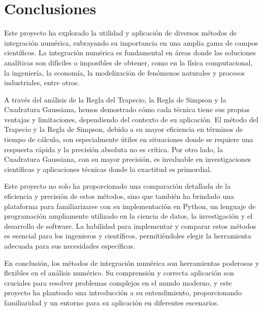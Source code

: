 \documentclass[a4paper]{article}
\begin{document}
    \section{Conclusiones}
    \label{sec:Conclusiones}
    Este proyecto ha explorado la utilidad y aplicación de diversos métodos de integración numérica, subrayando su importancia en una amplia gama de campos científicos. La integración numérica es fundamental en áreas donde las soluciones analíticas son difíciles o imposibles de obtener, como en la física computacional, la ingeniería, la economía, la modelización de fenómenos naturales y procesos industriales, entre otros.

    A través del análisis de la Regla del Trapecio, la Regla de Simpson y la Cuadratura Gaussiana, hemos demostrado cómo cada técnica tiene sus propias ventajas y limitaciones, dependiendo del contexto de su aplicación. El método del Trapecio y la Regla de Simpson, debido a su mayor eficiencia en términos de tiempo de cálculo, son especialmente útiles en situaciones donde se requiere una respuesta rápida y la precisión absoluta no es crítica. Por otro lado, la Cuadratura Gaussiana, con su mayor precisión, es invaluable en investigaciones científicas y aplicaciones técnicas donde la exactitud es primordial.
    
    Este proyecto no solo ha proporcionado una comparación detallada de la eficiencia y precisión de estos métodos, sino que también ha brindado una plataforma para familiarizarse con su implementación en Python, un lenguaje de programación ampliamente utilizado en la ciencia de datos, la investigación y el desarrollo de software. La habilidad para implementar y comparar estos métodos es esencial para los ingenieros y científicos, permitiéndoles elegir la herramienta adecuada para sus necesidades específicas.
    
    En conclusión, los métodos de integración numérica son herramientas poderosas y flexibles en el análisis numérico. Su comprensión y correcta aplicación son cruciales para resolver problemas complejos en el mundo moderno, y este proyecto ha planteado una introducción a su entendimiento, proporcionando familiaridad y un entorno para su aplicación en diferentes escenarios.    

    \printbibliography
\end{document}
